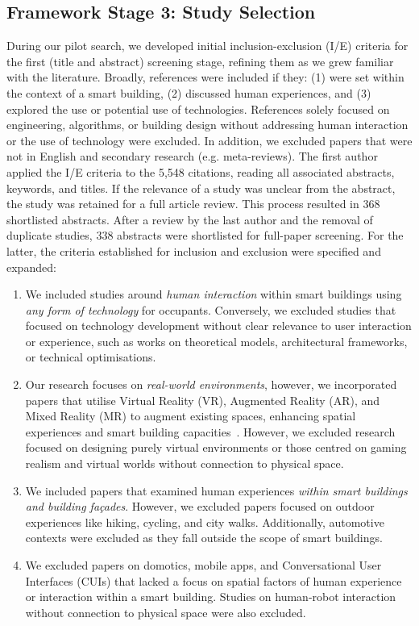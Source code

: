 \subsection{Framework Stage 3: Study Selection} 
\label{sec-ch2:iecrit}
During our pilot search, we developed initial inclusion-exclusion (I/E) criteria for the first (title and abstract) screening stage, refining them as we grew familiar with the literature. Broadly, references were included if they: (1) were set within the context of a smart building, (2) discussed human experiences, and (3) explored the use or potential use of technologies. References solely focused on engineering, algorithms, or building design without addressing human interaction or the use of technology were excluded. In addition, we excluded papers that were not in English and secondary research (e.g. meta-reviews). The first author applied the I/E criteria to the 5,548 citations, reading all associated abstracts, keywords, and titles. If the relevance of a study was unclear from the abstract, the study was retained for a full article review. This process resulted in 368 shortlisted abstracts. After a review by the last author and the removal of duplicate studies, 338 abstracts were shortlisted for full-paper screening. For the latter, the criteria established for inclusion and exclusion were specified and expanded:

\begin{enumerate}
    \item We included studies around \emph{human interaction} within smart buildings using \emph{any form of technology} for occupants. Conversely, we excluded studies that focused on technology development without clear relevance to user interaction or experience, such as works on theoretical models, architectural frameworks, or technical optimisations. 
    \item Our research focuses on \emph{real-world environments}, however, we incorporated papers that utilise Virtual Reality (VR), Augmented Reality (AR), and Mixed Reality (MR) to augment existing spaces, enhancing spatial experiences and smart building capacities~\cite{albarrak2023using, knierim2019exploring}. However, we excluded research focused on designing purely virtual environments or those centred on gaming realism and virtual worlds without connection to physical space.
    \item We included papers that examined human experiences \emph{within smart buildings and building fa\c{c}ades}. However, we excluded papers focused on outdoor experiences like hiking, cycling, and city walks. Additionally, automotive contexts were excluded as they fall outside the scope of smart buildings.
    \item We excluded papers on domotics, mobile apps, and Conversational User Interfaces (CUIs) that lacked a focus on spatial factors of human experience or interaction within a smart building. Studies on human-robot interaction without connection to physical space were also excluded.
\end{enumerate}

